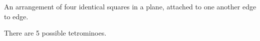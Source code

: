  An arrangement of four identical squares in a plane, 
attached to one another edge to edge.
\par
There are 5 possible tetrominoes.
